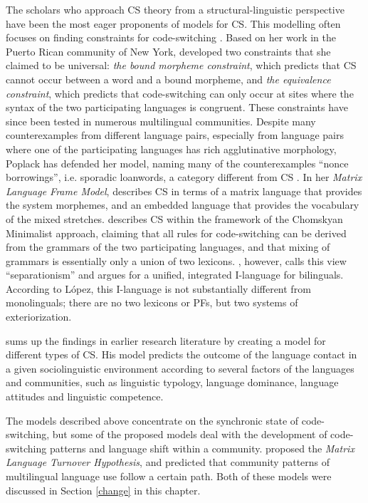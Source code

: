 \documentclass[output=paper]{langscibook}
\begin{document}
The scholars who approach CS theory from a structural-linguistic perspective have been the most eager proponents of models for CS. This modelling often focuses on finding constraints for code-switching \parencite[21]{gullberg2009technique}. Based on her work in the Puerto Rican community of New York, \textcite{poplack1980sometimes} developed two constraints that she claimed to be universal: \textit{the bound morpheme constraint}, which predicts that CS cannot occur between a word and a bound morpheme, and \textit{the equivalence constraint}, which predicts that code-switching can only occur at sites where the syntax of the two participating languages is congruent. These constraints have since been tested in numerous multilingual communities. Despite many counterexamples from different language pairs, especially from language pairs where one of the participating languages has rich agglutinative morphology, Poplack has defended her model, naming many of the counterexamples “nonce borrowings”, i.e. sporadic loanwords, a category different from CS \parencite{poplack1998introduction}. In her \textit{Matrix Language Frame Model}, \textcite{myers1997duelling} describes CS in terms of a matrix language that provides the system morphemes, and an embedded language that provides the vocabulary of the mixed stretches. \textcite{macswan1999minimalist} describes CS within the framework of the Chomskyan Minimalist approach, claiming that all rules for code-switching can be derived from the grammars of the two participating languages, and that mixing of grammars is essentially only a union of two lexicons. \textcite{lopez2020bilingual}, however, calls this view ``separationism'' and argues for a unified, integrated I-language for bilinguals. According to López, this I-language is not substantially different from monolinguals; there are no two lexicons or PFs, but two systems of exteriorization.

\textcite{muysken2000,muysken2013language} sums up the findings in earlier research literature by creating a model for different types of CS. His model predicts the outcome of the language contact in a given sociolinguistic environment according to several factors of the languages and communities, such as linguistic typology, language dominance, language attitudes and linguistic competence.

\begin{sloppypar}
The models described above concentrate on the synchronic state of code-switch\-ing, but some of the proposed models deal with the development of code-switch\-ing patterns and language shift within a community. \textcite{myers1997duelling} proposed the \textit{Matrix Language Turnover Hypothesis}, and \textcite{auer1999codeswitching} predicted that community patterns of multilingual language use follow a certain path. Both of these models were discussed in Section \ref{change} in this chapter.
\end{sloppypar}
\end{document}
